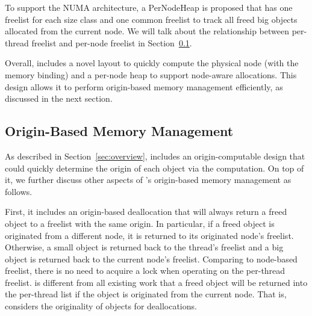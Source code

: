 
To support the NUMA architecture, a PerNodeHeap is proposed that has one freelist for each size class and one common freelist to track all freed big objects allocated from the current node. We will talk about the relationship between per-thread freelist and per-node freelist in Section~\ref{sec:origin}. 

Overall, \NM{} includes a novel layout to quickly compute the physical node (with the memory binding) and a per-node heap to support node-aware allocations. This design allows it to perform origin-based memory management efficiently, as discussed in the next section. 


\subsection{Origin-Based Memory Management} 
\label{sec:origin}


As described in Section~\ref{sec:overview}, \NM{} includes an origin-computable design that could quickly determine the origin of each object via the computation. On top of it, we further discuss other aspects of \NM{}'s origin-based memory management as follows.  

First, it includes an origin-based deallocation that will always return a freed object to a freelist with the same origin. In particular, if a freed object is originated from a different node, it is returned to its originated node's freelist. Otherwise, a small object is returned back to the thread's freelist and a big object is returned back to the current node's freelist. Comparing to node-based freelist, there is no need to acquire a lock when operating on the per-thread freelist. \NM{} is different from all existing work that a freed object will be returned into the per-thread list if the object is originated from the current node. That is, \NM{} considers the originality of objects for deallocations.   

